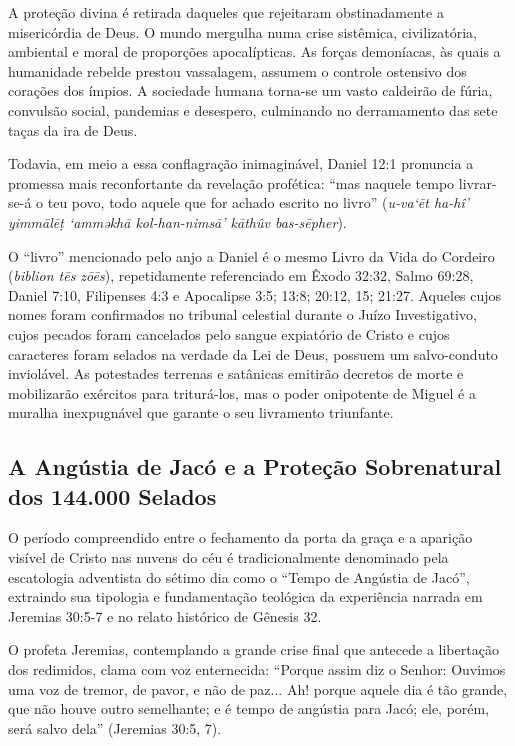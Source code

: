 \documentclass[11pt,a4paper,openany]{book}
\begin{document}
A proteção divina é retirada daqueles que rejeitaram obstinadamente a misericórdia de Deus. O mundo mergulha numa crise sistêmica, civilizatória, ambiental e moral de proporções apocalípticas. As forças demoníacas, às quais a humanidade rebelde prestou vassalagem, assumem o controle ostensivo dos corações dos ímpios. A sociedade humana torna-se um vasto caldeirão de fúria, convulsão social, pandemias e desespero, culminando no derramamento das sete taças da ira de Deus.

Todavia, em meio a essa conflagração inimaginável, Daniel 12:1 pronuncia a promessa mais reconfortante da revelação profética:
``mas naquele tempo livrar-se-á o teu povo, todo aquele que for achado escrito no livro'' (\textit{u-va‘ēt ha-hî’ yimmālēṭ ‘amməkhā kol-han-nimsā’ kāthûv bas-sēpher}).

O ``livro'' mencionado pelo anjo a Daniel é o mesmo Livro da Vida do Cordeiro (\textit{biblion tēs zōēs}), repetidamente referenciado em Êxodo 32:32, Salmo 69:28, Daniel 7:10, Filipenses 4:3 e Apocalipse 3:5; 13:8; 20:12, 15; 21:27. Aqueles cujos nomes foram confirmados no tribunal celestial durante o Juízo Investigativo, cujos pecados foram cancelados pelo sangue expiatório de Cristo e cujos caracteres foram selados na verdade da Lei de Deus, possuem um salvo-conduto inviolável. As potestades terrenas e satânicas emitirão decretos de morte e mobilizarão exércitos para triturá-los, mas o poder onipotente de Miguel é a muralha inexpugnável que garante o seu livramento triunfante.



\subsection{A Angústia de Jacó e a Proteção Sobrenatural dos 144.000 Selados}


O período compreendido entre o fechamento da porta da graça e a aparição visível de Cristo nas nuvens do céu é tradicionalmente denominado pela escatologia adventista do sétimo dia como o ``Tempo de Angústia de Jacó'', extraindo sua tipologia e fundamentação teológica da experiência narrada em Jeremias 30:5-7 e no relato histórico de Gênesis 32.

O profeta Jeremias, contemplando a grande crise final que antecede a libertação dos redimidos, clama com voz enternecida:
``Porque assim diz o Senhor: Ouvimos uma voz de tremor, de pavor, e não de paz... Ah! porque aquele dia é tão grande, que não houve outro semelhante; e é tempo de angústia para Jacó; ele, porém, será salvo dela'' (Jeremias 30:5, 7).
\end{document}
